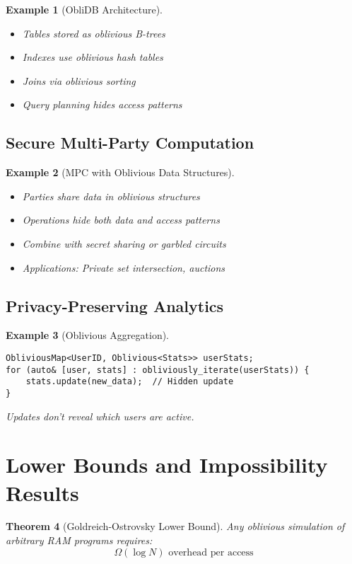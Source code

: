 \documentclass[11pt,final,hidelinks]{article}
\newtheorem{theorem}{Theorem}[section]
\newtheorem{example}[theorem]{Example}
\begin{document}
\begin{example}[ObliDB Architecture]
\begin{itemize}
    \item Tables stored as oblivious B-trees
    \item Indexes use oblivious hash tables
    \item Joins via oblivious sorting
    \item Query planning hides access patterns
\end{itemize}
\end{example}

\subsection{Secure Multi-Party Computation}

\begin{example}[MPC with Oblivious Data Structures]
\begin{itemize}
    \item Parties share data in oblivious structures
    \item Operations hide both data and access patterns
    \item Combine with secret sharing or garbled circuits
    \item Applications: Private set intersection, auctions
\end{itemize}
\end{example}

\subsection{Privacy-Preserving Analytics}

\begin{example}[Oblivious Aggregation]
\begin{verbatim}
ObliviousMap<UserID, Oblivious<Stats>> userStats;
for (auto& [user, stats] : obliviously_iterate(userStats)) {
    stats.update(new_data);  // Hidden update
}
\end{verbatim}
Updates don't reveal which users are active.
\end{example}

\section{Lower Bounds and Impossibility Results}

\begin{theorem}[Goldreich-Ostrovsky Lower Bound]
Any oblivious simulation of arbitrary RAM programs requires:
\begin{equation}
\Omega(\log N) \text{ overhead per access}
\end{equation}
\end{theorem}
\end{document}
